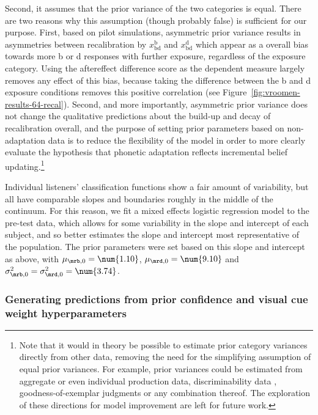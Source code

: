 Second, it assumes that the prior variance of the two categories is equal.
There are two reasons why this assumption (though probably false) is sufficient for our purpose.
First, based on pilot simulations, asymmetric prior variance results in asymmetries between recalibration by $x_\mathrm{bd}^\mathrm{b}$ and $x_\mathrm{bd}^\mathrm{d}$ which appear as a overall bias towards more \ph b or \ph d responses with further exposure, regardless of the exposure category.  Using the aftereffect difference score as the dependent measure largely removes any effect of this bias, because taking the difference between the \ph b and \ph d exposure conditions removes this positive correlation (see Figure~\ref{fig:vroomen-results-64-recal}).  Second, and more importantly, asymmetric prior variance does not change the qualitative predictions about the build-up and decay of recalibration overall, and the purpose of setting prior parameters based on non-adaptation data is to reduce the flexibility of the model in order to more clearly evaluate the hypothesis that phonetic adaptation reflects incremental belief updating.\footnote{Note that it would in theory be possible to estimate prior category variances directly from other data, removing the need for the simplifying assumption of equal prior variances. For example, prior variances could be estimated from aggregate or even individual production data, discriminability data \cite{Kronrod2012}, goodness-of-exemplar judgments \cite{Pisoni1974,Andruski1994} or any combination thereof. The exploration of these directions for model improvement are left for future work.}

Individual listeners' classification functions show a fair amount of variability, but all have comparable slopes and boundaries roughly in the middle of the continuum.  For this reason, we fit a mixed effects logistic regression model \cite{Jaeger2008} to the pre-test data, which allows for some variability in the slope and intercept of each subject, and so better estimates the slope and intercept most representative of the population.  The prior parameters were set based on this slope and intercept as above, with $\mu_{\mrb,0}=\num{1.10}$, $\mu_{\mrd,0}=\num{9.10}$ and $\sigma^2_{\mrb,0}=\sigma^2_{\mrd,0} = \num{3.74}$.

\subsubsection{Generating predictions from prior confidence and visual cue weight hyperparameters}
\label{sec:prior-conf-pseud}


